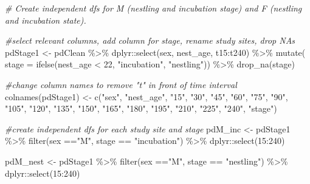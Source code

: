 \documentclass[
]{article}
\newenvironment{Shaded}{\begin{snugshade}}{\end{snugshade}}
\newcommand{\AttributeTok}[1]{\textcolor[rgb]{0.77,0.63,0.00}{#1}}
\newcommand{\CommentTok}[1]{\textcolor[rgb]{0.56,0.35,0.01}{\textit{#1}}}
\newcommand{\DecValTok}[1]{\textcolor[rgb]{0.00,0.00,0.81}{#1}}
\newcommand{\FunctionTok}[1]{\textcolor[rgb]{0.00,0.00,0.00}{#1}}
\newcommand{\NormalTok}[1]{#1}
\newcommand{\OtherTok}[1]{\textcolor[rgb]{0.56,0.35,0.01}{#1}}
\newcommand{\SpecialCharTok}[1]{\textcolor[rgb]{0.00,0.00,0.00}{#1}}
\newcommand{\StringTok}[1]{\textcolor[rgb]{0.31,0.60,0.02}{#1}}
\begin{document}
\begin{Shaded}
\begin{Highlighting}[]
\CommentTok{\# Create independent dfs for M (nestling and incubation stage) and F (nestling and incubation state). }

\CommentTok{\#select relevant columns, add column for stage, rename study sites, drop NAs}
\NormalTok{pdStage1 }\OtherTok{\textless{}{-}}\NormalTok{ pdClean }\SpecialCharTok{\%\textgreater{}\%}
\NormalTok{  dplyr}\SpecialCharTok{::}\FunctionTok{select}\NormalTok{(sex, nest\_age, t15}\SpecialCharTok{:}\NormalTok{t240) }\SpecialCharTok{\%\textgreater{}\%}
  \FunctionTok{mutate}\NormalTok{(}
    \AttributeTok{stage =}
      \FunctionTok{ifelse}\NormalTok{(nest\_age }\SpecialCharTok{\textless{}} \DecValTok{22}\NormalTok{, }\StringTok{"incubation"}\NormalTok{, }\StringTok{"nestling"}\NormalTok{)) }\SpecialCharTok{\%\textgreater{}\%}
  \FunctionTok{drop\_na}\NormalTok{(stage)}

\CommentTok{\#change column names to remove "t" in front of time interval}
\FunctionTok{colnames}\NormalTok{(pdStage1) }\OtherTok{\textless{}{-}} \FunctionTok{c}\NormalTok{(}\StringTok{"sex"}\NormalTok{, }\StringTok{"nest\_age"}\NormalTok{, }\StringTok{"15"}\NormalTok{, }\StringTok{"30"}\NormalTok{, }\StringTok{"45"}\NormalTok{, }\StringTok{"60"}\NormalTok{, }\StringTok{"75"}\NormalTok{, }\StringTok{"90"}\NormalTok{, }\StringTok{"105"}\NormalTok{, }\StringTok{"120"}\NormalTok{, }\StringTok{"135"}\NormalTok{, }\StringTok{"150"}\NormalTok{, }\StringTok{"165"}\NormalTok{, }\StringTok{"180"}\NormalTok{, }\StringTok{"195"}\NormalTok{, }\StringTok{"210"}\NormalTok{, }\StringTok{"225"}\NormalTok{, }\StringTok{"240"}\NormalTok{, }\StringTok{"stage"}\NormalTok{)}

\CommentTok{\#create independent dfs for each study site and stage}
\NormalTok{pdM\_inc }\OtherTok{\textless{}{-}}\NormalTok{ pdStage1 }\SpecialCharTok{\%\textgreater{}\%}
  \FunctionTok{filter}\NormalTok{(sex }\SpecialCharTok{==}\StringTok{"M"}\NormalTok{, stage }\SpecialCharTok{==} \StringTok{"incubation"}\NormalTok{) }\SpecialCharTok{\%\textgreater{}\%}
\NormalTok{  dplyr}\SpecialCharTok{::}\FunctionTok{select}\NormalTok{(}\StringTok{\textquotesingle{}15\textquotesingle{}}\SpecialCharTok{:}\StringTok{\textquotesingle{}240\textquotesingle{}}\NormalTok{)}

\NormalTok{pdM\_nest }\OtherTok{\textless{}{-}}\NormalTok{ pdStage1 }\SpecialCharTok{\%\textgreater{}\%} 
  \FunctionTok{filter}\NormalTok{(sex }\SpecialCharTok{==}\StringTok{"M"}\NormalTok{, stage }\SpecialCharTok{==} \StringTok{"nestling"}\NormalTok{) }\SpecialCharTok{\%\textgreater{}\%}
\NormalTok{  dplyr}\SpecialCharTok{::}\FunctionTok{select}\NormalTok{(}\StringTok{\textquotesingle{}15\textquotesingle{}}\SpecialCharTok{:}\StringTok{\textquotesingle{}240\textquotesingle{}}\NormalTok{)}


\end{Highlighting}
\end{Shaded}
\end{document}
